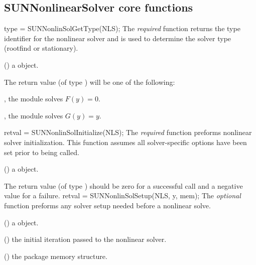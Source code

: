 \subsection{SUNNonlinearSolver core functions}
\label{ss:sunnonlinsol_corefn}
{
  type = SUNNonlinSolGetType(NLS);
}
{
  The \textit{required} function  returns the
  type identifier for the nonlinear solver  and is used to
  determine the solver type (rootfind or stationary).
}
{
  \begin{args}[NLS]
  \item[NLS] ()
    a {\sunnonlinsol} object.
  \end{args}
}
{
  The return value  (of type ) will be one of the
  following:
  \begin{args}
  \item[\Id{SUNNONLINEARSOLVER\_ROOTFIND}]
    , the {\sunnonlinsol} module solves $F(y) = 0$.
  \item[\Id{SUNNONLINEARSOLVER\_STATIONARY}]
    , the {\sunnonlinsol} module solves $G(y) = y$.
  \end{args}
}
{}
{
  retval = SUNNonlinSolInitialize(NLS);
}
{
  The \textit{required} function  preforms
  nonlinear solver initialization. This function assumes all
  solver-specific options have been set prior to being called.
}
{
  \begin{args}[NLS]
  \item[NLS] ()
    a {\sunnonlinsol} object.
  \end{args}
}
{
  The return value  (of type ) should be zero for a
  successful call and a negative value for a failure.
}
{}
{
  retval = SUNNonlinSolSetup(NLS, y, mem);
}
{
  The \textit{optional} function  preforms any
  solver setup needed before a nonlinear solve.
}
{
  \begin{args}[NLS]
  \item[NLS] ()
    a {\sunnonlinsol} object.
  \item[y] ()
    the initial iteration passed to the nonlinear solver.
  \item[mem] ()
    the {\sundials} package memory structure.
  \end{args}
}
